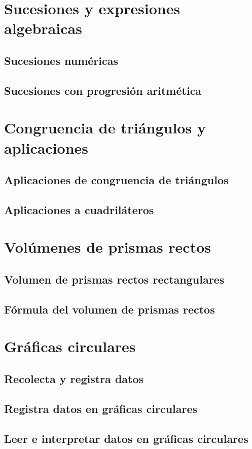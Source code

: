\documentclass[11pt]{book}
\begin{document}
\section{Sucesiones y expresiones algebraicas}
\subsection{Sucesiones numéricas}
\subsection{Sucesiones con progresión aritmética}

\section{Congruencia de triángulos y aplicaciones}
\subsection{Aplicaciones de congruencia de triángulos}
\subsection{Aplicaciones a cuadriláteros}

\section{Vol\'umenes de prismas rectos}
\subsection{Volumen de prismas rectos rectangulares}
\subsection{Fórmula del volumen de prismas rectos}

\section{Gráficas circulares}
\subsection{Recolecta y registra datos}
\subsection{Registra datos en gráficas circulares}
\subsection{Leer e interpretar datos en gráficas circulares}
\end{document}
